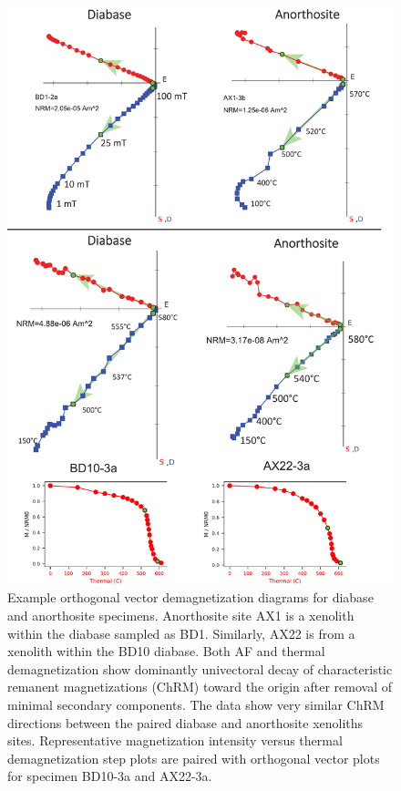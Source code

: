 \documentclass[draft]{agujournal2019}
\begin{document}
\begin{figure}
\noindent\includegraphics[width=\textwidth]{Demag.pdf}
\caption{\small{Example orthogonal vector demagnetization diagrams for diabase and anorthosite specimens. Anorthosite site AX1 is a xenolith within the diabase sampled as BD1. Similarly, AX22 is from a xenolith within the BD10 diabase. Both AF and thermal demagnetization show dominantly univectoral decay of characteristic remanent magnetizations (ChRM) toward the origin after removal of minimal secondary components. The data show very similar ChRM directions between the paired diabase and anorthosite xenoliths sites. Representative magnetization intensity versus thermal demagnetization step plots are paired with orthogonal vector plots for specimen BD10-3a and AX22-3a.}}
\label{fig:Demag}
\end{figure}
\end{document}
